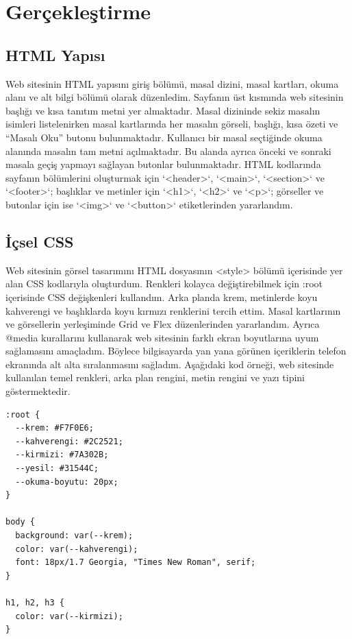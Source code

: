 \documentclass[12pt,a4paper]{article}
\begin{document}
\section{Gerçekleştirme}

\subsection{HTML Yapısı}
Web sitesinin HTML yapısını giriş bölümü, masal dizini, masal kartları, okuma alanı ve alt bilgi bölümü olarak düzenledim. Sayfanın üst kısmında web sitesinin başlığı ve kısa tanıtım metni yer almaktadır. Masal dizininde sekiz masalın isimleri listelenirken masal kartlarında her masalın görseli, başlığı, kısa özeti ve “Masalı Oku” butonu bulunmaktadır. Kullanıcı bir masal seçtiğinde okuma alanında masalın tam metni açılmaktadır. Bu alanda ayrıca önceki ve sonraki masala geçiş yapmayı sağlayan butonlar bulunmaktadır. HTML kodlarında sayfanın bölümlerini oluşturmak için `<header>`, `<main>`, `<section>` ve `<footer>`; başlıklar ve metinler için `<h1>`, `<h2>` ve `<p>`; görseller ve butonlar için ise `<img>` ve `<button>` etiketlerinden yararlandım.

\subsection{İçsel CSS}
Web sitesinin görsel tasarımını HTML dosyasının <style> bölümü içerisinde yer alan CSS kodlarıyla oluşturdum. Renkleri kolayca değiştirebilmek için :root içerisinde CSS değişkenleri kullandım. Arka planda krem, metinlerde koyu kahverengi ve başlıklarda koyu kırmızı renklerini tercih ettim. Masal kartlarının ve görsellerin yerleşiminde Grid ve Flex düzenlerinden yararlandım. Ayrıca @media kurallarını kullanarak web sitesinin farklı ekran boyutlarına uyum sağlamasını amaçladım. Böylece bilgisayarda yan yana görünen içeriklerin telefon ekranında alt alta sıralanmasını sağladım.
Aşağıdaki kod örneği, web sitesinde kullanılan temel renkleri, arka plan rengini, metin rengini ve yazı tipini göstermektedir.

\begin{lstlisting}[caption={İçsel CSS'ten önemli bir bölüm}]
:root {
  --krem: #F7F0E6;
  --kahverengi: #2C2521;
  --kirmizi: #7A302B;
  --yesil: #31544C;
  --okuma-boyutu: 20px;
}

body {
  background: var(--krem);
  color: var(--kahverengi);
  font: 18px/1.7 Georgia, "Times New Roman", serif;
}

h1, h2, h3 {
  color: var(--kirmizi);
}
\end{lstlisting}
\end{document}
